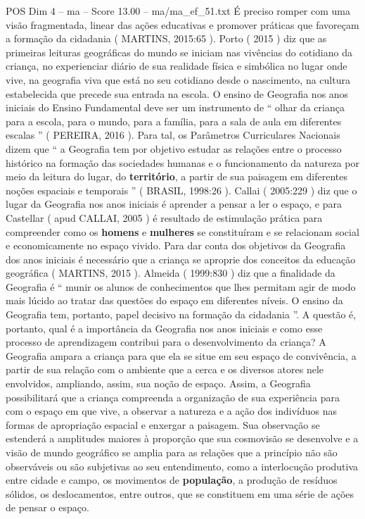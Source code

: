 \begin{textsample}{POS Dim 4 – ma – Score 13.00 – ma/ma\_ef\_51.txt}
É preciso romper com uma visão fragmentada, linear das ações educativas e promover práticas que favoreçam a formação da cidadania ( MARTINS, 2015:65 ).
Porto ( 2015 ) diz que as primeiras leituras geográficas do mundo se iniciam nas vivências do cotidiano da criança, no experienciar diário de sua realidade física e simbólica no lugar onde vive, na geografia viva que está no seu cotidiano desde o nascimento, na cultura estabelecida que precede sua entrada na escola.
O ensino de Geografia nos anos iniciais do Ensino Fundamental deve ser um instrumento de “ olhar da criança para a escola, para o mundo, para a família, para a sala de aula em diferentes escalas ” ( PEREIRA, 2016 ).
Para tal, os Parâmetros Curriculares Nacionais dizem que “ a Geografia tem por objetivo estudar as relações entre o processo histórico na formação das sociedades humanas e o funcionamento da natureza por meio da leitura do lugar, do \textbf{território}, a partir de sua paisagem em diferentes noções espaciais e temporais ” ( BRASIL, 1998:26 ).
Callai ( 2005:229 ) diz que o lugar da Geografia nos anos iniciais é aprender a pensar a ler o espaço, e para Castellar ( apud CALLAI, 2005 ) é resultado de estimulação prática para compreender como os \textbf{homens} e \textbf{mulheres} se constituíram e se relacionam social e economicamente no espaço vivido.
Para dar conta dos objetivos da Geografia dos anos iniciais é necessário que a criança se aproprie dos conceitos da educação geográfica ( MARTINS, 2015 ).
Almeida ( 1999:830 ) diz que a finalidade da Geografia é “ munir os alunos de conhecimentos que lhes permitam agir de modo mais lúcido ao tratar das questões do espaço em diferentes níveis.
O ensino da Geografia tem, portanto, papel decisivo na formação da cidadania ”.
A questão é, portanto, qual é a importância da Geografia nos anos iniciais e como esse processo de aprendizagem contribui para o desenvolvimento da criança?
A Geografia ampara a criança para que ela se situe em seu espaço de convivência, a partir de sua relação com o ambiente que a cerca e os diversos atores nele envolvidos, ampliando, assim, sua noção de espaço.
Assim, a Geografia possibilitará que a criança compreenda a organização de sua experiência para com o espaço em que vive, a observar a natureza e a ação dos indivíduos nas formas de apropriação espacial e enxergar a paisagem.
Sua observação se estenderá a amplitudes maiores à proporção que sua cosmovisão se desenvolve e a visão de mundo geográfico se amplia para as relações que a princípio não são observáveis ou são subjetivas ao seu entendimento, como a interlocução produtiva entre cidade e campo, os movimentos de \textbf{população}, a produção de resíduos sólidos, os deslocamentos, entre outros, que se constituem em uma série de ações de pensar o espaço.

\end{textsample}
